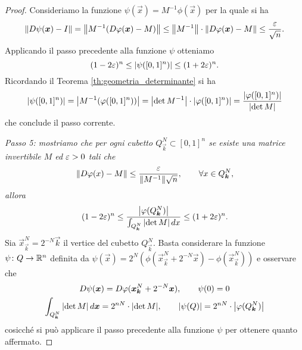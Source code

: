 \begin{proof}
Consideriamo la funzione $\psi(\vec x) = M^{-1} \phi(\vec x)$ per la quale si ha  
\[
  {\left\Vert D\psi(\boldsymbol x)-I\right\Vert} 
  = {\left\Vert M^{-1} (D\varphi(\boldsymbol x)-M)\right\Vert} 
  \le {\left\Vert M^{-1}\right\Vert} \cdot {\left\Vert D\varphi(\boldsymbol x)-M\right\Vert}
  \le \frac{\varepsilon}{\sqrt n}.
\]
Applicando il passo precedente alla funzione $\psi$ otteniamo 
\[
(1-2\varepsilon)^n \le {\left|\psi([0,1]^n)\right|} \le (1+2\varepsilon)^n.
\]
Ricordando il Teorema \ref{th:geometria_determinante} si ha
\[
  {\left|\psi([0,1]^n)\right|} = {\left|M^{-1}(\varphi([0,1]^n))\right|}
  = {\left|\det M^{-1}\right|} \cdot {\left|\varphi([0,1]^n)\right|}
  = \frac{{\left|\varphi([0,1]^n)\right|}}{{\left|\det M\right|}}
\]
che conclude il passo corrente.

\emph{Passo 5: mostriamo che per ogni cubetto $Q^N_{\vec k}\subset [0,1]^n$
se esiste una matrice invertibile $M$ ed $\varepsilon>0$ tali che 
\[
  {\left\Vert D\varphi(x)-M\right\Vert} \le \frac{\varepsilon}{{\left\Vert M^{-1}\right\Vert} \sqrt n}, \qquad \forall x\in Q^N_{\boldsymbol k},
\]
allora 
\[
(1-2\varepsilon)^n \le \frac{{\left|\varphi(Q^N_{\boldsymbol k})\right|}}{\int_{Q^N_{\boldsymbol k}}{\left|\det M\right|}\, dx} \le (1+2\varepsilon)^n.
\]
}
Sia $\vec x^N_{\vec k} = 2^{-N}\vec k$ il vertice del cubetto $Q^N_{\vec k}$.
Basta considerare la funzione $\psi\colon Q\to {\mathbb R}^n$ 
definita da $\psi(\vec x) = 2^N(\phi(\vec x^N_{\vec k} + 2^{-N}\vec x)-\phi(\vec x^N_{\vec k}))$ 
e osservare che
\begin{gather*}
  D\psi(\boldsymbol x) 
  = D\varphi(\boldsymbol x^N_{\boldsymbol k} + 2^{-N}\boldsymbol x), \qquad \psi(0)=0\\
  \int_{Q^N_{\boldsymbol k}} {\left|\det M\right|}\, d\boldsymbol x
  = 2^{nN}\cdot{\left|\det M\right|}, \qquad
  {\left|\psi(Q)\right|} = 2^{nN} \cdot {\left|\varphi(Q^N_{\boldsymbol k})\right|}
\end{gather*}
cosicché si può applicare il passo precedente alla funzione $\psi$
per ottenere quanto affermato.


\end{proof}
